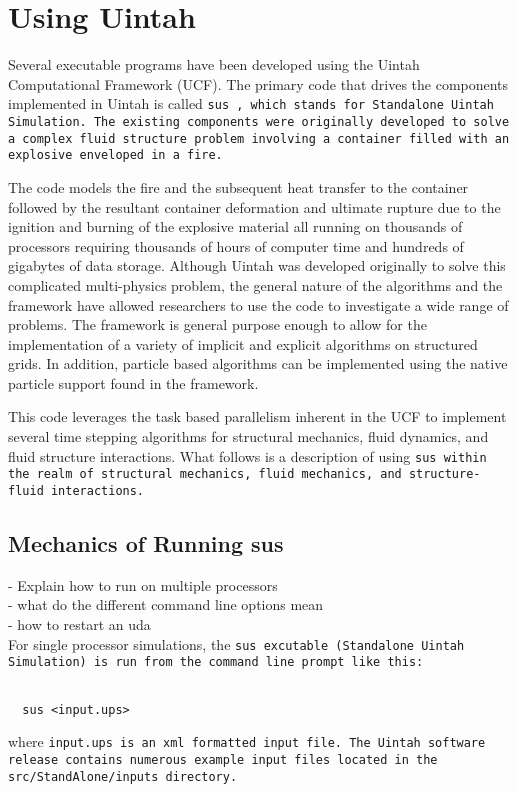 \section{Using Uintah} \label{Sec:UCF}

Several executable programs have been developed using the Uintah
Computational Framework (UCF).  The primary code that drives the
components implemented in Uintah is called \tt sus \normalfont, which
stands for Standalone Uintah Simulation.  The existing components were
originally developed to solve a complex fluid structure problem
involving a container filled with an explosive enveloped in a fire.

The code models the fire and the subsequent heat transfer to the
container followed by the resultant container deformation and ultimate
rupture due to the ignition and burning of the explosive material all
running on thousands of processors requiring thousands of hours of
computer time and hundreds of gigabytes of data storage.  Although
Uintah was developed originally to solve this complicated
multi-physics problem, the general nature of the algorithms and the
framework have allowed researchers to use the code to investigate a
wide range of problems.  The framework is general purpose enough to
allow for the implementation of a variety of implicit and explicit
algorithms on structured grids.  In addition, particle based
algorithms can be implemented using the native particle support found
in the framework.

This code leverages the task based parallelism inherent in the UCF to
implement several time stepping algorithms for structural mechanics,
fluid dynamics, and fluid structure interactions.  What follows is a
description of using \tt sus \normalfont within the realm of
structural mechanics, fluid mechanics, and structure-fluid
interactions.


\subsection{Mechanics of Running sus}
 - Explain how to run on multiple processors\\
 - what do the different command line options mean\\
 - how to restart an uda\\

For single processor simulations, the \tt sus \normalfont excutable
(Standalone Uintah Simulation) is run from the command line prompt
like this:
\begin{Verbatim}[fontsize=\footnotesize]

  sus <input.ups>

\end{Verbatim}
where \tt input.ups \normalfont is an xml formatted input file.  The
Uintah software release contains numerous example input files located
in the src/StandAlone/inputs directory.


